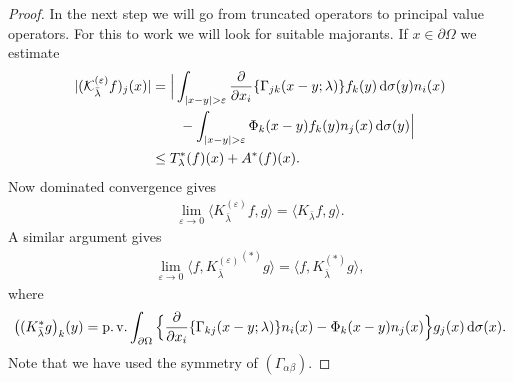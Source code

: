 \begin{proof}
  In the next step we will go from truncated operators to principal value operators. 
  For this to work we will look for suitable majorants.
  If $x \in \partial\Omega$ we estimate
  \begin{align*}
    |(\mathcal{K}_{\bar\lambda}^{(\varepsilon)}f)_j (x)|
    &= \Big| \int_{|x - y| > \varepsilon} \frac{\partial}{\partial x_i} \{ \Gamma_{jk}(x - y; \lambda) \} f_k(y) \, {\operatorname{d}\!{\sigma}}(y) n_i(x)  \\
    &\qquad - \int_{|x - y| > \varepsilon} \Phi_k(x - y) f_k(y) n_j(x) \, {\operatorname{d}\!{\sigma}}(y) \Big| \\
    &\leq T_\lambda^*(f)(x) + A^*(f)(x).
  \end{align*}
  Now dominated convergence gives
  \begin{align*}
    \lim_{\varepsilon \to 0} \langle K_{\bar\lambda}^{(\varepsilon)} f, g \rangle = \langle K_{\bar\lambda} f, g\rangle.
  \end{align*}
  A similar argument gives
  \begin{align*}
    \lim_{\varepsilon \to 0} \langle f, {K_{\bar\lambda}^{(\varepsilon)}}^{(*)} g \rangle = \langle f,K_{\bar\lambda}^{(*)}  g\rangle,
  \end{align*}
  where
  \begin{align*}
    \big( ( K_{\bar\lambda}^* g\big)_k(y)
    = \operatorname{p. v.}\int_{\partial\Omega} \Big\{ \frac{\partial}{\partial x_i} \{ \Gamma_{kj}(x - y; \lambda)\} n_i(x) - \Phi_k(x - y) n_j(x) \Big\} g_j(x) \, {\operatorname{d}\!{\sigma}}(x). 
  \end{align*}
  Note that we have used the symmetry of $(\Gamma_{\alpha\beta})$.


\end{proof}
